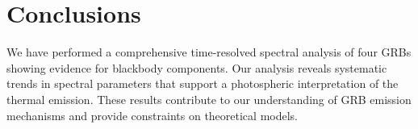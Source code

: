 \documentclass[twocolumn]{aastex631}
\begin{document}
    \section{Conclusions}
    \label{sec:conclusions}

    We have performed a comprehensive time-resolved spectral analysis of four GRBs showing evidence for blackbody components.
    Our analysis reveals systematic trends in spectral parameters that support a photospheric interpretation of the thermal emission.
    These results contribute to our understanding of GRB emission mechanisms and provide constraints on theoretical models.

    
    
\end{document}

